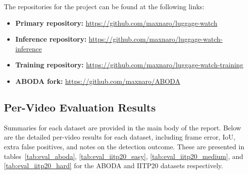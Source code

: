 The repositories for the project can be found at the following links:
\begin{itemize}
	\item \textbf{Primary repository:} \url{https://github.com/maxnaro/luggage-watch}
	\item \textbf{Inference repository:} \url{https://github.com/maxnaro/luggage-watch-inference}
	\item \textbf{Training repository:} \url{https://github.com/maxnaro/luggage-watch-training}
	\item \textbf{ABODA fork:} \url{https://github.com/maxnaro/ABODA}
\end{itemize}

\subsection{Per-Video Evaluation Results}
\label{sec:per_video_results}

Summaries for each dataset are provided in the main body of the report. Below
are the detailed per-video results for each dataset, including frame error,
IoU, extra false positives, and notes on the detection outcome. These are
presented in tables~\ref{tab:eval_aboda}, \ref{tab:eval_iitp20_easy},
\ref{tab:eval_iitp20_medium}, and \ref{tab:eval_iitp20_hard} for the ABODA and
IITP20 datasets respectively.

